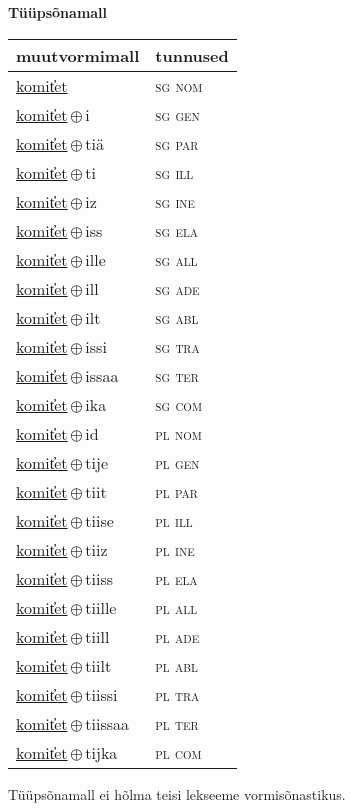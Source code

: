 

\vspace{3.5em}
\noindent \begin{minipage}{\textwidth}
\noindent \textbf{Tüüpsõnamall \,}\\

\begin{sideways}
\begin{tabular}{l l}
muutvormimall & tunnused \\
\hline
\underline{komit̕et} & \textsc{ sg nom } \\
\underline{komit̕et}\,$\oplus$\,i & \textsc{ sg gen } \\
\underline{komit̕et}\,$\oplus$\,tiä & \textsc{ sg par } \\
\underline{komit̕et}\,$\oplus$\,ti & \textsc{ sg ill } \\
\underline{komit̕et}\,$\oplus$\,iz & \textsc{ sg ine } \\
\underline{komit̕et}\,$\oplus$\,iss & \textsc{ sg ela } \\
\underline{komit̕et}\,$\oplus$\,ille & \textsc{ sg all } \\
\underline{komit̕et}\,$\oplus$\,ill & \textsc{ sg ade } \\
\underline{komit̕et}\,$\oplus$\,ilt & \textsc{ sg abl } \\
\underline{komit̕et}\,$\oplus$\,issi & \textsc{ sg tra } \\
\underline{komit̕et}\,$\oplus$\,issaa & \textsc{ sg ter } \\
\underline{komit̕et}\,$\oplus$\,ika & \textsc{ sg com } \\
\underline{komit̕et}\,$\oplus$\,id & \textsc{ pl nom } \\
\underline{komit̕et}\,$\oplus$\,tije & \textsc{ pl gen } \\
\underline{komit̕et}\,$\oplus$\,tiit & \textsc{ pl par } \\
\underline{komit̕et}\,$\oplus$\,tiise & \textsc{ pl ill } \\
\underline{komit̕et}\,$\oplus$\,tiiz & \textsc{ pl ine } \\
\underline{komit̕et}\,$\oplus$\,tiiss & \textsc{ pl ela } \\
\underline{komit̕et}\,$\oplus$\,tiille & \textsc{ pl all } \\
\underline{komit̕et}\,$\oplus$\,tiill & \textsc{ pl ade } \\
\underline{komit̕et}\,$\oplus$\,tiilt & \textsc{ pl abl } \\
\underline{komit̕et}\,$\oplus$\,tiissi & \textsc{ pl tra } \\
\underline{komit̕et}\,$\oplus$\,tiissaa & \textsc{ pl ter } \\
\underline{komit̕et}\,$\oplus$\,tijka & \textsc{ pl com } \\
\end{tabular}
\end{sideways}
\label{tab:tüüpsõnamall-komit̕et}

\end{minipage}

 
\vspace{1em}
\noindent Tüüpsõnamall  ei hõlma teisi lekseeme vormi\-sõnastikus.
